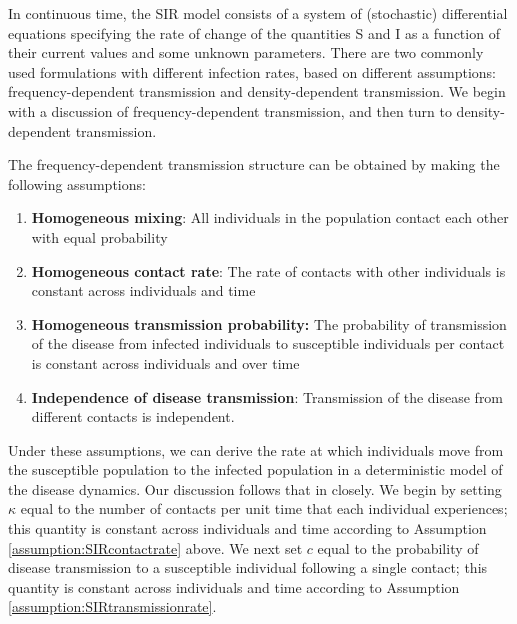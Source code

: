 \documentclass[fleqn]{article}\usepackage[]{graphicx}\usepackage[]{color}
\begin{document}
In continuous time, the SIR model consists of a system of (stochastic) differential equations specifying the rate of change of the quantities S and I as a function of their current values and some unknown parameters.  There are two commonly used formulations with different infection rates, based on different assumptions: frequency-dependent transmission and density-dependent transmission.  We begin with a discussion of frequency-dependent transmission, and then turn to density-dependent transmission.

The frequency-dependent transmission structure can be obtained by making the following assumptions:
\begin{enumerate}
\item \textbf{Homogeneous mixing}: All individuals in the population contact each other with equal probability \label{assumption:SIRmixing}
\item \textbf{Homogeneous contact rate}: The rate of contacts with other individuals is constant across individuals and time \label{assumption:SIRcontactrate}
\item \textbf{Homogeneous transmission probability:} The probability of transmission of the disease from infected individuals to susceptible individuals per contact is constant across individuals and over time \label{assumption:SIRtransmissionrate}
\item \textbf{Independence of disease transmission}: Transmission of the disease from different contacts is independent. \label{assumption:SIRtransmissionsindependent}
\end{enumerate}

Under these assumptions, we can derive the rate at which individuals move from the susceptible population to the infected population in a deterministic model of the disease dynamics.  Our discussion follows that in \cite{keeling2008modelingInfectiousDiseases} closely.  We begin by setting $\kappa$ equal to the number of contacts per unit time that each individual experiences; this quantity is constant across individuals and time according to Assumption \ref{assumption:SIRcontactrate} above.  We next set $c$ equal to the probability of disease transmission to a susceptible individual following a single contact; this quantity is constant across individuals and time according to Assumption \ref{assumption:SIRtransmissionrate}.
\end{document}
